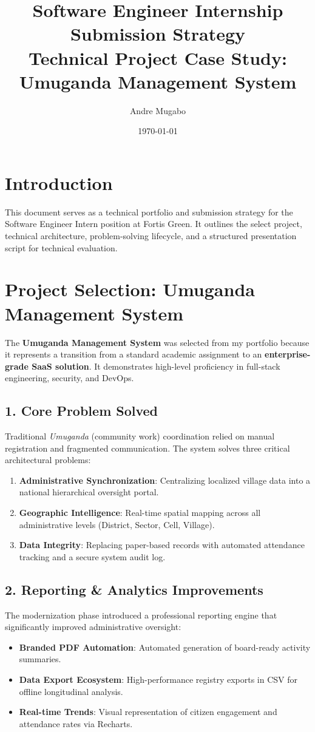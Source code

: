 \documentclass[11pt,a4paper]{article}
\title{Software Engineer Internship Submission Strategy\\ \large Technical Project Case Study: Umuganda Management System}
\author{Andre Mugabo}
\date{\today}
\begin{document}
\maketitle

\section{Introduction}
This document serves as a technical portfolio and submission strategy for the Software Engineer Intern position at Fortis Green. It outlines the select project, technical architecture, problem-solving lifecycle, and a structured presentation script for technical evaluation.

\section{Project Selection: Umuganda Management System}
The \textbf{Umuganda Management System} was selected from my portfolio because it represents a transition from a standard academic assignment to an \textbf{enterprise-grade SaaS solution}. It demonstrates high-level proficiency in full-stack engineering, security, and DevOps.

\subsection{1. Core Problem Solved}
Traditional \textit{Umuganda} (community work) coordination relied on manual registration and fragmented communication. The system solves three critical architectural problems:
\begin{enumerate}[noitemsep]
    \item \textbf{Administrative Synchronization}: Centralizing localized village data into a national hierarchical oversight portal.
    \item \textbf{Geographic Intelligence}: Real-time spatial mapping across all administrative levels (District, Sector, Cell, Village).
    \item \textbf{Data Integrity}: Replacing paper-based records with automated attendance tracking and a secure system audit log.
\end{enumerate}

\subsection{2. Reporting \& Analytics Improvements}
The modernization phase introduced a professional reporting engine that significantly improved administrative oversight:
\begin{itemize}[noitemsep]
    \item \textbf{Branded PDF Automation}: Automated generation of board-ready activity summaries.
    \item \textbf{Data Export Ecosystem}: High-performance registry exports in CSV for offline longitudinal analysis.
    \item \textbf{Real-time Trends}: Visual representation of citizen engagement and attendance rates via Recharts.
\end{itemize}
\end{document}
